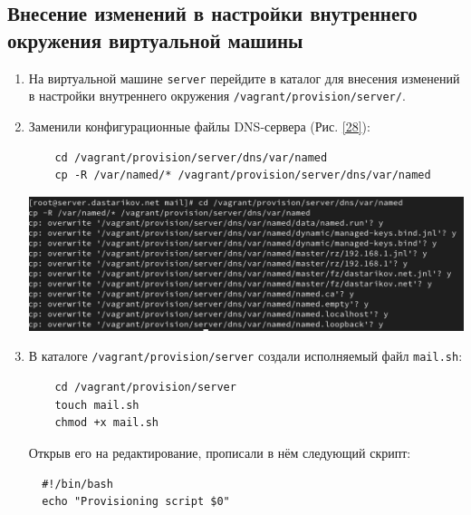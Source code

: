 \subsection{Внесение изменений в настройки внутреннего окружения виртуальной машины}
\begin{enumerate}

\item На виртуальной машине \texttt{server} перейдите в каталог для внесения изменений в настройки внутреннего окружения
\texttt{/vagrant/provision/server/}.
\item Заменили конфигурационные файлы DNS-сервера (Рис. \ref{28}):
  \begin{verbatim}
    cd /vagrant/provision/server/dns/var/named
    cp -R /var/named/* /vagrant/provision/server/dns/var/named
  \end{verbatim}
\begin{center}
    \centering
    \includegraphics[width=\textwidth]{../images/image28.png}
    \label{28}
\end{center}

\item В каталоге \texttt{/vagrant/provision/server} создали исполняемый файл \texttt{mail.sh}:
  \begin{verbatim}
    cd /vagrant/provision/server
    touch mail.sh
    chmod +x mail.sh
  \end{verbatim}
Открыв его на редактирование, прописали в нём следующий скрипт:
\begin{verbatim}
  #!/bin/bash
  echo "Provisioning script $0"


\end{verbatim}
\end{enumerate}
